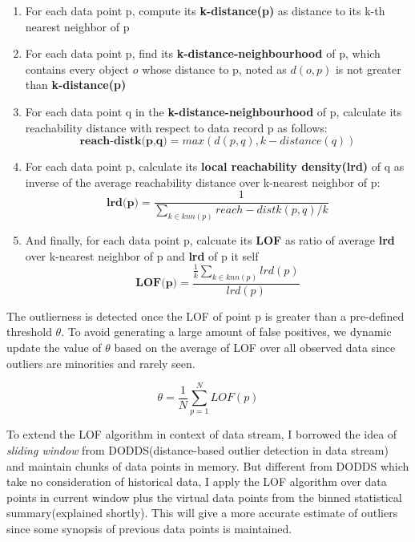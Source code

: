 \documentclass[11pt]{article}       %
\begin{document}
\begin{enumerate} \label{lof_algorithm}
	\item For each data point p, compute its \textbf{k-distance(p)} as distance to its k-th nearest neighbor of p
	\item For each data point p, find its \textbf{k-distance-neighbourhood} of p, which contains every object $o$ whose distance to p, noted as $d(o, p)$ is not greater than \textbf{k-distance(p)}
	\item For each data point q in the \textbf{k-distance-neighbourhood} of p, calculate its reachability distance with respect to data record p as follows:
		\begin{equation} \label{rdist}
			\textbf{reach-distk(p,q)} = max(d(p,q), k-distance(q))
		\end{equation}
	\item For each data point p, calculate its \textbf{local reachability density(lrd)} of q as inverse of the average reachability distance over k-nearest neighbor of p:
		\begin{equation} \label{lrd}
			\textbf{lrd(p)} =  \frac{1}{\sum\limits_{k \in knn(p)} reach-distk(p,q) / k}
		\end{equation}
	\item And finally, for each data point p, calcuate its \textbf{LOF} as ratio of average \textbf{lrd} over k-nearest neighbor of p and \textbf{lrd} of p it self
		\begin{equation} \label{lof}
			\textbf{LOF(p)} = \frac{\frac{1}{k} \sum_{k \in knn(p)} lrd(p)}{lrd(p)}
		\end{equation}
\end{enumerate}

The outlierness is detected once the LOF of point p is greater than a pre-defined threshold $\theta$. To avoid generating a large amount of false positives, we dynamic update the value of $\theta$ based on the average of LOF over all observed data since outliers are minorities and rarely seen.

\[ \theta = \frac{1}{N} \sum_{p=1}^{N} LOF(p) \]

To extend the LOF algorithm in context of data stream, I borrowed the idea of \textit{sliding window} from DODDS(distance-based outlier detection in data stream) and maintain chunks of data points in memory. But different from DODDS which take no consideration of historical data, I apply the LOF algorithm over data points in current window plus the virtual data points from the binned statistical summary(explained shortly). This will give a more accurate estimate of outliers since some synopsis of previous data points is maintained.
\end{document}
